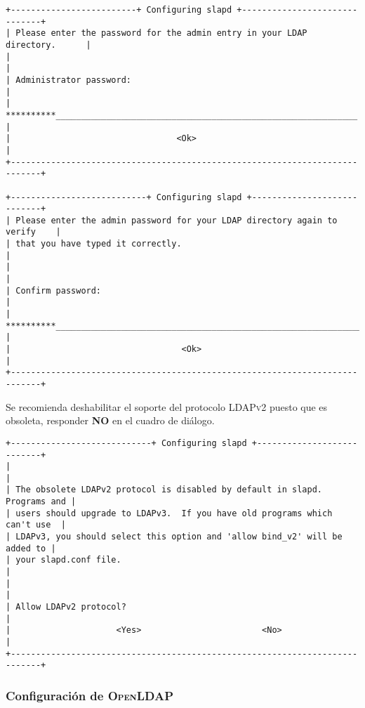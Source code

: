 {
\scriptsize
\linespread{1}
\begin{verbatim}
+-------------------------+ Configuring slapd +------------------------------+
| Please enter the password for the admin entry in your LDAP directory.      |
|                                                                            |
| Administrator password:                                                    |
| **********____________________________________________________________     |
|                                 <Ok>                                       |
+----------------------------------------------------------------------------+

+---------------------------+ Configuring slapd +----------------------------+
| Please enter the admin password for your LDAP directory again to verify    |
| that you have typed it correctly.                                          |
|                                                                            |
| Confirm password:                                                          |
| **********_______________________________________________________________  |
|                                  <Ok>                                      |
+----------------------------------------------------------------------------+
\end{verbatim}
}

Se recomienda deshabilitar el soporte del protocolo \textsc{LDAPv2} puesto que es obsoleta, responder \textbf{NO} en el cuadro de di\'{a}logo.

{
\scriptsize
\linespread{1}
\begin{verbatim}
+----------------------------+ Configuring slapd +---------------------------+
|                                                                            |
| The obsolete LDAPv2 protocol is disabled by default in slapd. Programs and |
| users should upgrade to LDAPv3.  If you have old programs which can't use  |
| LDAPv3, you should select this option and 'allow bind_v2' will be added to |
| your slapd.conf file.                                                      |
|                                                                            |
| Allow LDAPv2 protocol?                                                     |
|                     <Yes>                        <No>                      |
+----------------------------------------------------------------------------+
\end{verbatim}
}

          \subsubsection {Configuraci\'{o}n de \textsc{OpenLDAP}}


